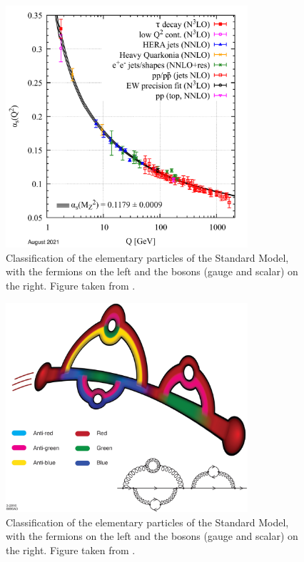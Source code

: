 \begin{figure}[h]
	\centering
	\includegraphics[width=0.8\textwidth]{Figs/Chapter2/alphas-v-Q-2021.pdf}
	\caption{Classification of the elementary particles of the Standard Model, with the fermions on the left and the bosons (gauge and scalar) on the right. Figure taken from \cite{deurQCDRunningCoupling2016}.}
	\label{fig:RunningAlphaS}
\end{figure}

\begin{figure}[h]
	\centering
	\includegraphics[width=0.8\textwidth]{Figs/Chapter2/1-s2.0-S0146641016300035-gr1_lrg.jpg}
	\caption{Classification of the elementary particles of the Standard Model, with the fermions on the left and the bosons (gauge and scalar) on the right. Figure taken from \cite{deurQCDRunningCoupling2016}.}
	\label{fig:ColourSpread}
\end{figure}


